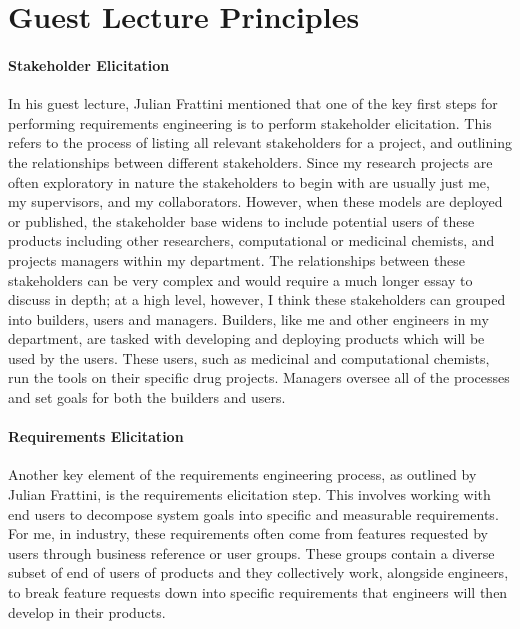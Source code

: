 \documentclass{article}
\begin{document}
\section{Guest Lecture Principles}

\paragraph{Stakeholder Elicitation}

In his guest lecture, Julian Frattini mentioned that one of the key first steps for performing requirements engineering is to perform stakeholder elicitation. This refers to the process of listing all relevant stakeholders for a project, and outlining the relationships between different stakeholders. Since my research projects are often exploratory in nature the stakeholders to begin with are usually just me, my supervisors, and my collaborators. However, when these models are deployed or published, the stakeholder base widens to include potential users of these products including other researchers, computational or medicinal chemists, and projects managers within my department. The relationships between these stakeholders can be very complex and would require a much longer essay to discuss in depth; at a high level, however, I think these stakeholders can grouped into builders, users and managers. Builders, like me and other engineers in my department, are tasked with developing and deploying products which will be used by the users. These users, such as medicinal and computational chemists, run the tools on their specific drug projects. Managers oversee all of the processes and set goals for both the builders and users.


\paragraph{Requirements Elicitation}

Another key element of the requirements engineering process, as outlined by Julian Frattini, is the requirements elicitation step. This involves working with end users to decompose system goals into specific and measurable requirements. For me, in industry, these requirements often come from features requested by users through business reference or user groups. These groups contain a diverse subset of end of users of products and they collectively work, alongside engineers, to break feature requests down into specific requirements that engineers will then develop in their products.
\end{document}
